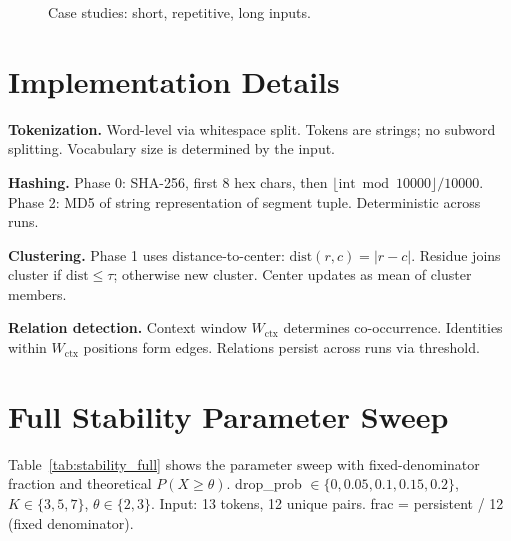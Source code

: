 \begin{figure}[t]
\centering
{}
\caption{Case studies: short, repetitive, long inputs.}
\label{fig:app:cases}
\end{figure}

\section{Implementation Details}
\label{app:impl}

\textbf{Tokenization.}
Word-level via whitespace split. Tokens are strings; no subword splitting. Vocabulary size is determined by the input.

\textbf{Hashing.}
Phase 0: SHA-256, first 8 hex chars, then $\lfloor \text{int} \bmod 10000 \rfloor / 10000$. Phase 2: MD5 of string representation of segment tuple. Deterministic across runs.

\textbf{Clustering.}
Phase 1 uses distance-to-center: $\text{dist}(r, c) = |r - c|$. Residue joins cluster if $\text{dist} \leq \tau$; otherwise new cluster. Center updates as mean of cluster members.

\textbf{Relation detection.}
Context window $W_{\text{ctx}}$ determines co-occurrence. Identities within $W_{\text{ctx}}$ positions form edges. Relations persist across runs via threshold.

\section{Full Stability Parameter Sweep}
\label{app:stability_full}

Table~\ref{tab:stability_full} shows the parameter sweep with fixed-denominator fraction and theoretical $P(X \geq \theta)$. drop\_prob $\in \{0, 0.05, 0.1, 0.15, 0.2\}$, $K \in \{3, 5, 7\}$, $\theta \in \{2, 3\}$. Input: 13 tokens, 12 unique pairs. frac = persistent / 12 (fixed denominator).

